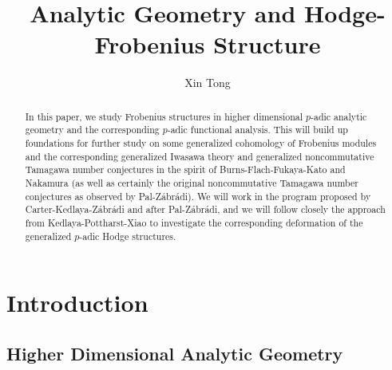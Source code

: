 \documentclass[12pt]{amsart}
\theoremstyle{definition}
\numberwithin{equation}{section}
\begin{document}
\normalfont


\title{Analytic Geometry and Hodge-Frobenius Structure}
\author{Xin Tong}



\maketitle


\begin{abstract}
\rm  In this paper, we study Frobenius structures in higher dimensional $p$-adic analytic geometry and the corresponding $p$-adic functional analysis. This will build up foundations for further study on some generalized cohomology of Frobenius modules and the corresponding generalized Iwasawa theory and generalized noncommutative Tamagawa number conjectures in the spirit of Burns-Flach-Fukaya-Kato and Nakamura (as well as certainly the original noncommutative Tamagawa number conjectures as observed by Pal-Z\'abr\'adi). We will work in the program proposed by Carter-Kedlaya-Z\'abr\'adi and after Pal-Z\'abr\'adi, and we will follow closely the approach from Kedlaya-Pottharst-Xiao to investigate the corresponding deformation of the generalized $p$-adic Hodge structures. 
\end{abstract}



\newpage

\tableofcontents


\newpage


\section{Introduction}

\subsection{Higher Dimensional Analytic Geometry}
\end{document}
